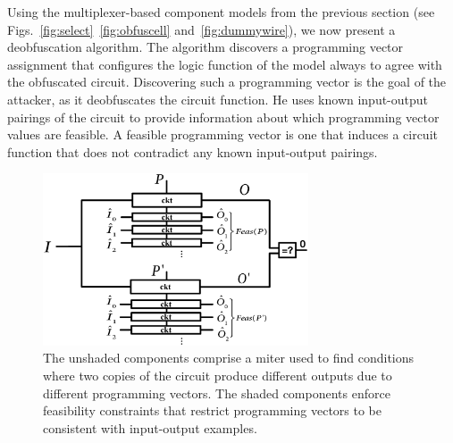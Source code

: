 \documentclass[proposal]{umassthesis}  %
\begin{document}
Using the multiplexer-based component models from the previous section (see Figs.~\ref{fig:select}~\ref{fig:obfuscell} and~\ref{fig:dummywire}), we now present a deobfuscation algorithm. The algorithm discovers a programming vector assignment that configures the logic function of the model always to agree with the obfuscated circuit. Discovering such a programming vector is the goal of the attacker, as it deobfuscates the circuit function. He uses known input-output pairings of the circuit {to provide information about} which programming vector values are feasible. A feasible programming vector is one that induces a circuit function that does not contradict any known input-output pairings.

  \begin{figure}[!htb]
  \centering
    \includegraphics[width=0.7\textwidth]{./figures/miter} 
    \caption{The unshaded components comprise a miter used to find conditions where two copies of the circuit produce different outputs due to different programming vectors. The shaded components enforce feasibility constraints that restrict programming vectors to be consistent with input-output examples.}
    \label{fig:miter}
  \end{figure}

\end{document}
